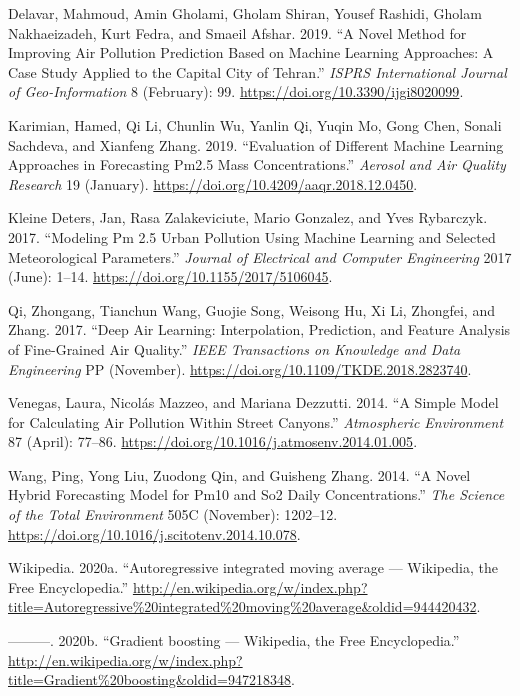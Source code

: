 \documentclass[
  12pt,
]{article}
\begin{document}
\leavevmode\hypertarget{ref-article3}{}%
Delavar, Mahmoud, Amin Gholami, Gholam Shiran, Yousef Rashidi, Gholam
Nakhaeizadeh, Kurt Fedra, and Smaeil Afshar. 2019. ``A Novel Method for
Improving Air Pollution Prediction Based on Machine Learning Approaches:
A Case Study Applied to the Capital City of Tehran.'' \emph{ISPRS
International Journal of Geo-Information} 8 (February): 99.
\url{https://doi.org/10.3390/ijgi8020099}.

\leavevmode\hypertarget{ref-article7}{}%
Karimian, Hamed, Qi Li, Chunlin Wu, Yanlin Qi, Yuqin Mo, Gong Chen,
Sonali Sachdeva, and Xianfeng Zhang. 2019. ``Evaluation of Different
Machine Learning Approaches in Forecasting Pm2.5 Mass Concentrations.''
\emph{Aerosol and Air Quality Research} 19 (January).
\url{https://doi.org/10.4209/aaqr.2018.12.0450}.

\leavevmode\hypertarget{ref-article5}{}%
Kleine Deters, Jan, Rasa Zalakeviciute, Mario Gonzalez, and Yves
Rybarczyk. 2017. ``Modeling Pm 2.5 Urban Pollution Using Machine
Learning and Selected Meteorological Parameters.'' \emph{Journal of
Electrical and Computer Engineering} 2017 (June): 1--14.
\url{https://doi.org/10.1155/2017/5106045}.

\leavevmode\hypertarget{ref-article6}{}%
Qi, Zhongang, Tianchun Wang, Guojie Song, Weisong Hu, Xi Li, Zhongfei,
and Zhang. 2017. ``Deep Air Learning: Interpolation, Prediction, and
Feature Analysis of Fine-Grained Air Quality.'' \emph{IEEE Transactions
on Knowledge and Data Engineering} PP (November).
\url{https://doi.org/10.1109/TKDE.2018.2823740}.

\leavevmode\hypertarget{ref-article2}{}%
Venegas, Laura, Nicolás Mazzeo, and Mariana Dezzutti. 2014. ``A Simple
Model for Calculating Air Pollution Within Street Canyons.''
\emph{Atmospheric Environment} 87 (April): 77--86.
\url{https://doi.org/10.1016/j.atmosenv.2014.01.005}.

\leavevmode\hypertarget{ref-article1}{}%
Wang, Ping, Yong Liu, Zuodong Qin, and Guisheng Zhang. 2014. ``A Novel
Hybrid Forecasting Model for Pm10 and So2 Daily Concentrations.''
\emph{The Science of the Total Environment} 505C (November): 1202--12.
\url{https://doi.org/10.1016/j.scitotenv.2014.10.078}.

\leavevmode\hypertarget{ref-wiki:Autoregressive_integrated_moving_average}{}%
Wikipedia. 2020a. ``Autoregressive integrated moving average ---
Wikipedia, the Free Encyclopedia.''
\url{http://en.wikipedia.org/w/index.php?title=Autoregressive\%20integrated\%20moving\%20average\&oldid=944420432}.

\leavevmode\hypertarget{ref-wiki:Gradient_boosting}{}%
---------. 2020b. ``Gradient boosting --- Wikipedia, the Free
Encyclopedia.''
\url{http://en.wikipedia.org/w/index.php?title=Gradient\%20boosting\&oldid=947218348}.
\end{document}
